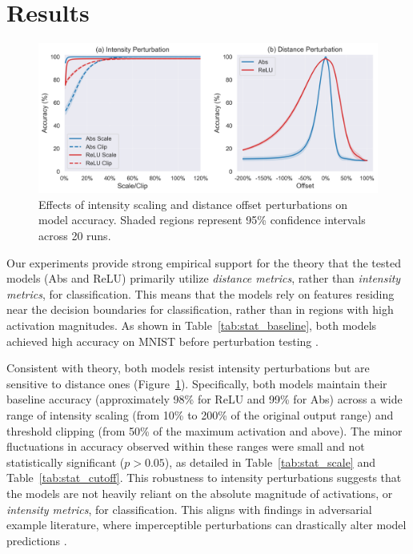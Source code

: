 \section{Results}

\begin{figure}[ht]
 \centering
 \includegraphics[width=\textwidth]{images/perturbation_analysis}
 \caption{Effects of intensity scaling and distance offset perturbations on model accuracy. Shaded regions represent 95\% confidence intervals across 20 runs.}
 \label{fig:perturbation_analysis}
\end{figure}

Our experiments provide strong empirical support for the theory that the tested models (Abs and ReLU) primarily utilize \emph{distance metrics}, rather than \emph{intensity metrics}, for classification. This means that the models rely on features residing near the decision boundaries for classification, rather than in regions with high activation magnitudes. As shown in Table~\ref{tab:stat_baseline}, both models achieved high accuracy on MNIST before perturbation testing \citep{lecun1998gradient}.

Consistent with theory, both models resist intensity perturbations but are sensitive to distance ones (Figure~\ref{fig:perturbation_analysis}). Specifically, both models maintain their baseline accuracy (approximately 98\% for ReLU and 99\% for Abs) across a wide range of intensity scaling (from 10\% to 200\% of the original output range) and threshold clipping (from 50\% of the maximum activation and above). The minor fluctuations in accuracy observed within these ranges were small and not statistically significant ($p > 0.05$), as detailed in Table~\ref{tab:stat_scale} and Table~\ref{tab:stat_cutoff}. This robustness to intensity perturbations suggests that the models are not heavily reliant on the absolute magnitude of activations, or \emph{intensity metrics}, for classification. This aligns with findings in adversarial example literature, where imperceptible perturbations can drastically alter model predictions \citep{szegedy2013intriguing,goodfellow2014explaining}.

